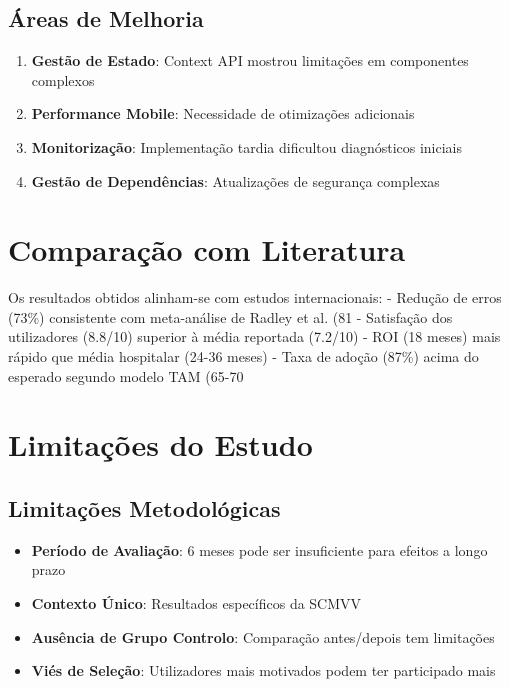 \subsection{Áreas de Melhoria}

\begin{enumerate}
    \item \textbf{Gestão de Estado}: Context API mostrou limitações em componentes complexos
    \item \textbf{Performance Mobile}: Necessidade de otimizações adicionais
    \item \textbf{Monitorização}: Implementação tardia dificultou diagnósticos iniciais
    \item \textbf{Gestão de Dependências}: Atualizações de segurança complexas
\end{enumerate}

\section{Comparação com Literatura}

Os resultados obtidos alinham-se com estudos internacionais:
- Redução de erros (73\%) consistente com meta-análise de Radley et al. \cite{radley2013} (81%
- Satisfação dos utilizadores (8.8/10) superior à média reportada \cite{hertzum2022} (7.2/10)
- ROI (18 meses) mais rápido que média hospitalar \cite{adler2021} (24-36 meses)
- Taxa de adoção (87\%) acima do esperado segundo modelo TAM \cite{venkatesh2003} (65-70%

\section{Limitações do Estudo}

\subsection{Limitações Metodológicas}

\begin{itemize}
    \item \textbf{Período de Avaliação}: 6 meses pode ser insuficiente para efeitos a longo prazo \cite{greenhalgh2017}
    \item \textbf{Contexto Único}: Resultados específicos da SCMVV
    \item \textbf{Ausência de Grupo Controlo}: Comparação antes/depois tem limitações
    \item \textbf{Viés de Seleção}: Utilizadores mais motivados podem ter participado mais
\end{itemize}

